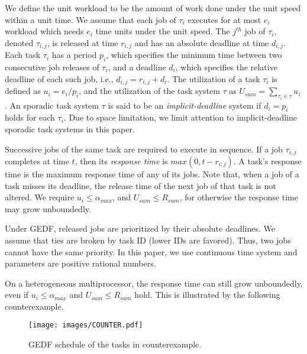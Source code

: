 \documentclass[Times, 10pt,twocolumn]{article}
\theoremstyle{definition}
\begin{document}
We define the unit workload to be the amount of work done under the unit speed within a unit time. We assume that each job of $\tau_i$ executes for at most $e_i$ workload which needs $e_i$ time units under the unit speed. The $j^{th}$ job of $\tau_i$, denoted $\tau_{i,j}$, is released at time $r_{i,j}$ and has an absolute deadline at time $d_{i,j}$.  Each task $\tau_i$ has a period $p_i$, which specifies the minimum time between two consecutive job releases of $\tau_i$, and a deadline $d_i$, which specifies the relative deadline of each such job, i.e., $d_{i,j}=r_{i,j}+d_i$. The utilization of a task $\tau_i$ is defined as $u_i=e_i/p_i$, and the utilization of the task system $\tau$ as $U_{sum}=\sum_{\tau_i \in \tau} u_i$. An sporadic task system $\tau$ is said to be an \textit{implicit-deadline} system if $d_i = p_i$ holds for each $\tau_i$. Due to space limitation, we limit attention to implicit-deadline sporadic task systems in this paper.



\normalsize


Successive jobs of the same task are required to execute in sequence. If a job $\tau_{i,j}$ completes at time $t$, then its \textit{response time} is $max(0, t-r_{i,j})$. A task's response time is the maximum response time of any of its jobs. Note that, when a job of a task misses its deadline, the release time of the next job of that task is not altered. We require $u_i \leq \alpha_{max}$, and $U_{sum} \leq R_{sum}$, for otherwise the response time may grow unboundedly. 







Under GEDF, released jobs are prioritized by their absolute deadlines. We assume that ties are broken by task ID (lower IDs are favored). Thus, two jobs cannot have the same priority. In this paper, we use continuous time system and parameters are positive rational numbers.  

On a heterogeneous multiprocessor, the response time can still grow unboundedly, even if $u_i \leq \alpha_{max}$ and $U_{sum} \leq R_{sum}$ hold. This is illustrated by the following counterexample.   

\begin{figure}[t]
	\begin{center}
	\texttt{[image: images/COUNTER.pdf]} 
	\end{center} 
\vspace{-5mm}
\caption{\small GEDF schedule of the tasks in counterexample.}
\vspace{-5mm}
\label{fig:counter}
\end{figure}
\end{document}
